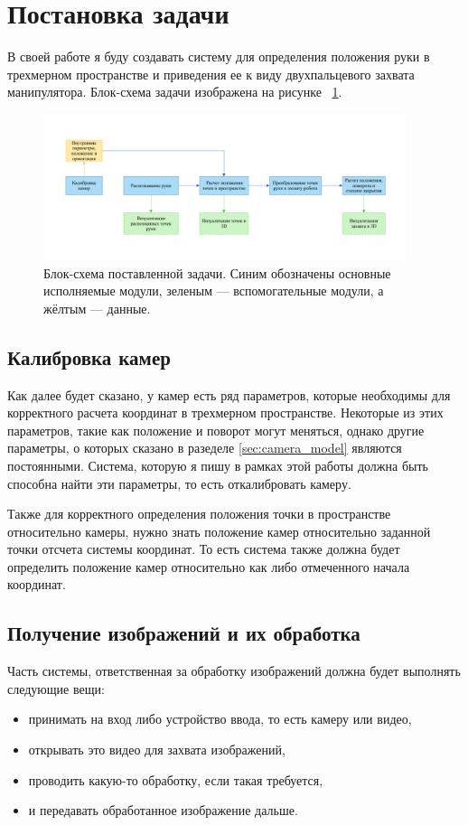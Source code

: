 \documentclass[12pt, a4paper]{article}
\begin{document}
\section{Постановка задачи}
В своей работе я буду создавать систему для определения положения руки в
трехмерном пространстве и приведения ее к виду двухпальцевого захвата
манипулятора.
Блок-схема задачи изображена на рисунке ~\ref{fig:problem_block_scheme}. 
\begin{figure}[h!]
  \begin{center}
    \includegraphics[width=0.95\textwidth]{images/block-schemes/problem_scheme.png}
  \end{center}
  \caption{
    Блок-схема поставленной задачи. Синим обозначены основные
    исполняемые модули, зеленым --- вспомогательные модули, а жёлтым ---
    данные.
  }
\label{fig:problem_block_scheme}
\end{figure}

\subsection{Калибровка камер}
Как далее будет сказано, у камер есть ряд параметров, которые необходимы для
корректного расчета координат в трехмерном пространстве. Некоторые из этих
параметров, такие как положение и поворот могут меняться, однако другие
параметры, о которых сказано в разеделе \ref{sec:camera_model} являются
постоянными.  Система, которую я пишу в рамках этой работы должна быть способна
найти эти параметры, то есть откалибровать камеру.
\par
Также для корректного определения положения точки в пространстве относительно
камеры, нужно знать положение камер относительно заданной точки отсчета системы
координат. То есть система также должна будет определить положение камер
относительно как либо отмеченного начала координат.

\subsection{Получение изображений и их обработка}
Часть системы, ответственная за обработку изображений должна будет выполнять следующие вещи:
\begin{itemize}
    \item принимать на вход либо устройство ввода, то есть камеру или видео,
    \item открывать это видео для захвата изображений,
    \item проводить какую-то обработку, если такая требуется,
    \item и передавать обработанное изображение дальше.
\end{itemize} 
\end{document}
